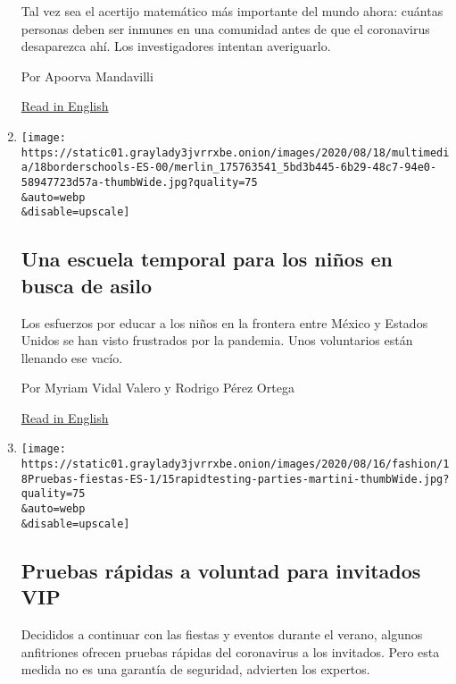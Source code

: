 \begin{enumerate}
  Tal vez sea el acertijo matemático más importante del mundo ahora:
  cuántas personas deben ser inmunes en una comunidad antes de que el
  coronavirus desaparezca ahí. Los investigadores intentan averiguarlo.

  Por Apoorva Mandavilli

  \href{https://www.nytimes3xbfgragh.onion/2020/08/17/health/coronavirus-herd-immunity.html}{Read
  in English}
\item
  \href{/es/2020/08/18/espanol/america-latina/escuela-frontera-mexico.html}{}

  \texttt{[image: https://static01.graylady3jvrrxbe.onion/images/2020/08/18/multimedia/18borderschools-ES-00/merlin\_175763541\_5bd3b445-6b29-48c7-94e0-58947723d57a-thumbWide.jpg?quality=75\\\&auto=webp\\\&disable=upscale]}

  \hypertarget{una-escuela-temporal-para-los-niuxf1os-en-busca-de-asilo}{%
  \subsection{Una escuela temporal para los niños en busca de
  asilo}\label{una-escuela-temporal-para-los-niuxf1os-en-busca-de-asilo}}

  Los esfuerzos por educar a los niños en la frontera entre México y
  Estados Unidos se han visto frustrados por la pandemia. Unos
  voluntarios están llenando ese vacío.

  Por Myriam Vidal Valero y Rodrigo Pérez Ortega

  \href{https://www.nytimes3xbfgragh.onion/2020/08/18/parenting/migrant-children-school-border.html}{Read
  in English}
\item
  \href{/es/2020/08/18/espanol/estilos-de-vida/prueba-rapida-coronavirus.html}{}

  \texttt{[image: https://static01.graylady3jvrrxbe.onion/images/2020/08/16/fashion/18Pruebas-fiestas-ES-1/15rapidtesting-parties-martini-thumbWide.jpg?quality=75\\\&auto=webp\\\&disable=upscale]}

  \hypertarget{pruebas-ruxe1pidas-a-voluntad-para-invitados-vip}{%
  \subsection{Pruebas rápidas a voluntad para invitados
  VIP}\label{pruebas-ruxe1pidas-a-voluntad-para-invitados-vip}}

  Decididos a continuar con las fiestas y eventos durante el verano,
  algunos anfitriones ofrecen pruebas rápidas del coronavirus a los
  invitados. Pero esta medida no es una garantía de seguridad, advierten
  los expertos.


\end{enumerate}
